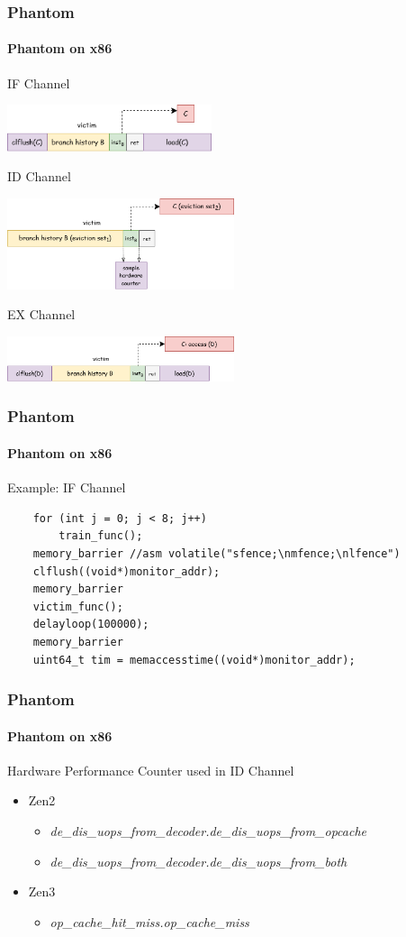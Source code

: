 \documentclass{beamer}
\begin{document}
\begin{frame}
    \frametitle{Phantom}
    \framesubtitle{Phantom on x86}
    IF Channel
    \begin{center}
        \includegraphics[width=0.45\textwidth]{Figure/IF Channel.png}
    \end{center}
    ID Channel
    \begin{center}
        \includegraphics[width=0.5\textwidth]{Figure/ID Channel.png}
    \end{center}
    EX Channel
    \begin{center}
        \includegraphics[width=0.5\textwidth]{Figure/EX Channel.png}
    \end{center}
\end{frame}

\begin{frame}[fragile]
    \frametitle{Phantom}
    \framesubtitle{Phantom on x86}
    Example: IF Channel
    \begin{lstlisting}
    for (int j = 0; j < 8; j++)
        train_func();
    memory_barrier //asm volatile("sfence;\nmfence;\nlfence")
    clflush((void*)monitor_addr); 
    memory_barrier
    victim_func();
    delayloop(100000);
    memory_barrier
    uint64_t tim = memaccesstime((void*)monitor_addr);
    \end{lstlisting}
\end{frame}

\begin{frame}[fragile]
    \frametitle{Phantom}
    \framesubtitle{Phantom on x86}
    Hardware Performance Counter used in ID Channel 
    \begin{itemize}
        \item Zen2
            \begin{itemize}
                \item \textit{de\_dis\_uops\_from\_decoder.de\_dis\_uops\_from\_opcache}
                \item \textit{de\_dis\_uops\_from\_decoder.de\_dis\_uops\_from\_both}
            \end{itemize}
        \item Zen3
            \begin{itemize}
                \item \textit{op\_cache\_hit\_miss.op\_cache\_miss}
            \end{itemize}
    \end{itemize}
\end{frame}
\end{document}
